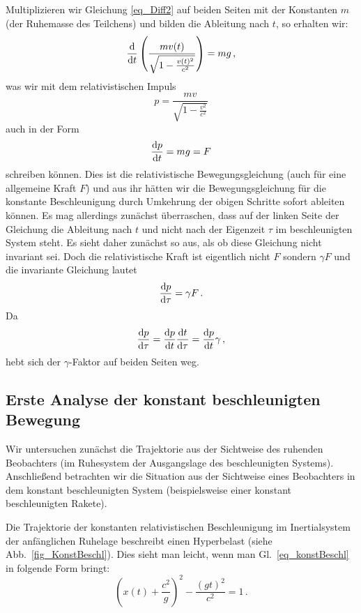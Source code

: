 Multiplizieren wir Gleichung \ref{eq_Diff2} auf beiden
Seiten mit der Konstanten $m$ (der Ruhemasse des Teilchens)
und bilden die
Ableitung nach $t$, so erhalten wir:
\begin{equation}
      \frac{\rm d}{{\rm d}t} \left( \frac{m v(t)}{\sqrt{1-\frac{v(t)^2}{c^2}}}
      \right)  = mg  \, ,
\end{equation}
was wir mit dem relativistischen Impuls 
\begin{equation}
         p = \frac{mv}{\sqrt{1 - \frac{v^2}{c^2}}} 
\end{equation}
auch in der Form
\begin{equation}
          \frac{{\rm d}p}{{\rm d}t} = mg = F 
\end{equation} 
schreiben k\"onnen. Dies ist die relativistische
Bewegungsgleichung (auch f\"ur eine allgemeine Kraft $F$)
und aus ihr h\"atten wir die Bewegungsgleichung
f\"ur die konstante Beschleunigung durch Umkehrung der
obigen Schritte sofort ableiten k\"onnen. Es mag allerdings
zun\"achst \"uberraschen, dass auf der linken Seite
der Gleichung die Ableitung nach $t$ und nicht nach
der Eigenzeit $\tau$ im beschleunigten System steht.
Es sieht daher zun\"achst so aus, als ob diese Gleichung nicht
invariant sei. Doch die relativistische Kraft ist eigentlich
nicht $F$ sondern $\gamma F$ und die invariante
Gleichung lautet
\begin{equation}
          \frac{{\rm d}p}{{\rm d}\tau} = \gamma F  \, .
\end{equation}
Da
\begin{equation} 
      \frac{{\rm d}p}{{\rm d}\tau} =    \frac{{\rm d}p}{{\rm d}t}
      \frac{{\rm d}t}{{\rm d}\tau} =    \frac{{\rm d}p}{{\rm d}t} \gamma \, ,
\end{equation}
hebt sich der $\gamma$-Faktor auf beiden Seiten weg.

\subsection{Erste Analyse der konstant
beschleunigten Bewegung}
  
Wir untersuchen zun\"achst die Trajektorie aus der
Sichtweise des ruhenden Beobachters (im Ruhesystem
der Ausgangslage des beschleunigten Systems).
Anschlie\ss end betrachten wir die Situation aus
der Sichtweise eines Beobachters in dem 
konstant beschleunigten System (beispielsweise
einer konstant beschleunigten Rakete).    
  
Die Trajektorie der konstanten
relativistischen Beschleunigung im Inertialsys\-tem
der anf\"anglichen Ruhelage beschreibt einen 
Hyperbelast (siehe Abb.\ \ref{fig_KonstBeschl}).
Dies sieht man leicht, wenn man Gl.\ \ref{eq_konstBeschl}  
in folgende Form bringt:
\begin{equation}
   \left(  x(t) + \frac{c^2}{g} \right)^2 - \frac{(gt)^2}{c^2} = 1 \, . 
\end{equation}
    
